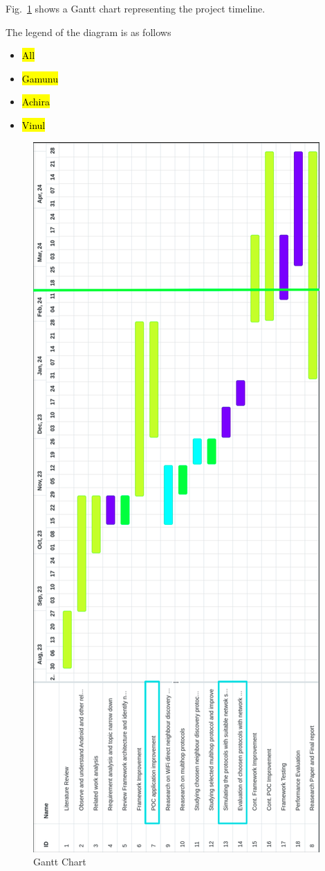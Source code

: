 \documentclass[12pt, conference, onecolumn, a4paper]{IEEEtran}
\begin{document}
Fig.~\ref{gantt} shows a Gantt chart representing the project timeline.

The legend of the diagram is as follows
\begin{itemize}
    \item \hl{All}
    \item \hl{Gamunu}
    \item \hl{Achira}
    \item \hl{Vinul}
\end{itemize}

\begin{figure}[htbp]
    \centerline{\includegraphics[height=1.4\textwidth]{imgs/gantt.png}}
    \caption{Gantt Chart}
    \label{gantt}
\end{figure}
\end{document}
